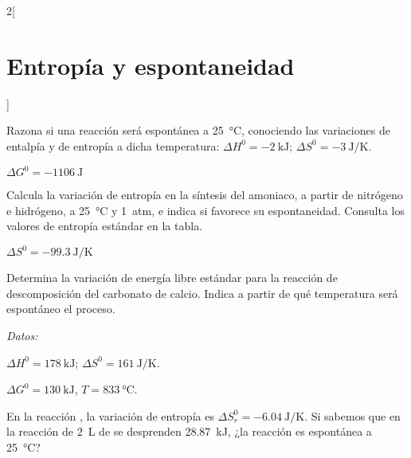 \documentclass[10pt]{article}
\newenvironment{gexdatos}{
      \vspace{2pt}
      \noindent\textit{Datos:}
    }{\vspace{5pt}}
\begin{document}
\begin{multicols}{2}[
  \section{Entropía y espontaneidad}
  ]
  \begin{exercise}[
      tags    = {termodinámica, espontaneidad, Gibbs},
      topics  = {química, termoquímica, termodinámica},
      source  = {},
    ]
    Razona si una reacción será espontánea a \SI{25}{\celsius}, conociendo las variaciones de entalpía y de entropía a dicha temperatura: \( \Delta H^0 = \SI{-2}{\kilo\joule} \); \( \Delta S^0 = \SI{-3}{\joule\per\kelvin} \).
  \end{exercise}

  \begin{solution}
    \( \Delta G^0 = \SI{-1106}{\joule} \)
  \end{solution}




  \begin{exercise}[
      tags    = {termodinámica, espontaneidad},
      topics  = {química, termoquímica, termodinámica},
      source  = {},
    ]
    Calcula la variación de entropía en la síntesis del amoniaco, a partir de nitrógeno e hidrógeno, a \SI{25}{\celsius} y \SI{1}{atm}, e indica si favorece su espontaneidad. Consulta los valores de entropía estándar en la tabla.
  \end{exercise}

  \begin{solution}
    \( \Delta S^0 = \SI{-99.3}{\joule\per\kelvin} \)
  \end{solution}




  \begin{exercise}[
      tags    = {termodinámica, espontaneidad, Gibbs},
      topics  = {química, termoquímica, termodinámica},
      source  = {},
    ]
    Determina la variación de energía libre estándar para la reacción de descomposición del carbonato de calcio. Indica a partir de qué temperatura será espontáneo el proceso.

    \begin{gexdatos}
      \( \Delta H^0 = \SI{178}{\kilo\joule} \); \( \Delta S^0 = \SI{161}{\joule\per\kelvin} \).
    \end{gexdatos}
  \end{exercise}

  \begin{solution}
    \( \Delta G^0 = \SI{130}{\kilo\joule} \), \( T = \SI{833}{\celsius} \).
  \end{solution}




  \begin{exercise}[
      tags    = {termodinámica, espontaneidad, Gibbs},
      topics  = {química, termoquímica, termodinámica},
      source  = {},
    ]
    En la reacción , la variación de entropía es \( \Delta S^0_r = \SI{-6.04}{\joule\per\kelvin} \). Si sabemos que en la reacción de \SI{2}{\liter} de  se desprenden \SI{28.87}{\kilo\joule}, ¿la reacción es espontánea a \SI{25}{\celsius}?
  \end{exercise}


\end{multicols}
\end{document}
